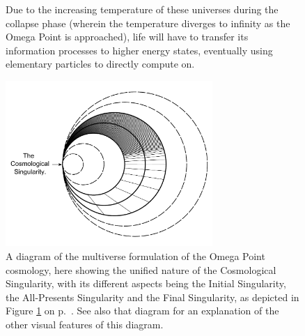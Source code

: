 \documentclass[letterpaper,12pt]{article}
\begin{document}
\begin{figure}[htbp]
{    \hspace{1em}Due to the increasing temperature of these universes during the collapse phase (wherein the temperature diverges to infinity as the Omega Point is approached), life will have to transfer its information processes to higher energy states, eventually using elementary particles to directly compute on.}
  \label{fig:Multiverse-Omega-Point.pdf}
\end{figure}

\begin{figure}[htbp]
  \centering
    \includegraphics[width=0.7\textwidth]{Circle-Multiverse-Omega-Point.pdf}
  \caption[The Multiversal Formulation of the Omega Point Cosmology 2]{A diagram of the multiverse formulation of the Omega Point cosmology, here showing the unified nature of the Cosmological Singularity, with its different aspects being the Initial Singularity, the All-Presents Singularity and the Final Singularity, as depicted in Figure \ref{fig:Multiverse-Omega-Point.pdf} on p.~\pageref{fig:Multiverse-Omega-Point.pdf}. See also that diagram for an explanation of the other visual features of this diagram.}
  \label{fig:Circle-Multiverse-Omega-Point.pdf}
\end{figure}
\end{document}
